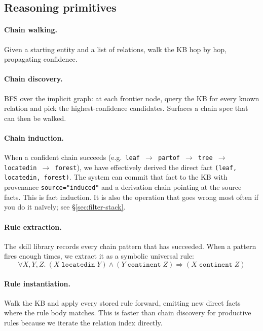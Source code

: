 \documentclass[11pt]{article}
\begin{document}
\subsection{Reasoning primitives}

\paragraph{Chain walking.} Given a starting entity and a list of
relations, walk the KB hop by hop, propagating confidence.

\paragraph{Chain discovery.} BFS over the implicit graph: at each
frontier node, query the KB for every known relation and pick the
highest-confidence candidates. Surfaces a chain spec that can then
be walked.

\paragraph{Chain induction.} When a confident chain succeeds (e.g.\
\texttt{leaf $\rightarrow$ partof $\rightarrow$ tree $\rightarrow$
locatedin $\rightarrow$ forest}), we have effectively derived the
direct fact \texttt{(leaf, locatedin, forest)}. The system can
commit that fact to the KB with provenance \texttt{source="induced"}
and a derivation chain pointing at the source facts. This is fact
induction. It is also the operation that goes wrong most often
if you do it na\"{i}vely; see \S\ref{sec:filter-stack}.

\paragraph{Rule extraction.} The skill library records every
chain pattern that has succeeded. When a pattern fires enough times,
we extract it as a symbolic universal rule:
\[
\forall X, Y, Z.\ (X \;\texttt{locatedin}\; Y) \land (Y \;\texttt{continent}\; Z) \Rightarrow (X \;\texttt{continent}\; Z)
\]

\paragraph{Rule instantiation.} Walk the KB and apply every stored
rule forward, emitting new direct facts where the rule body matches.
This is faster than chain discovery for productive rules because we
iterate the relation index directly.
\end{document}

